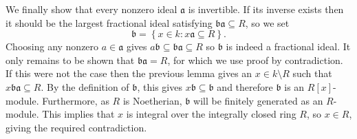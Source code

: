 \documentclass[12pt]{article}
\begin{document}
We finally show that every nonzero ideal $\mathfrak{a}$ is invertible. If its inverse exists then it should be the largest fractional ideal satisfying $\mathfrak{ba}\subseteq R$, so we set
\begin{equation*}
\mathfrak{b}=\left\{x\in k:x\mathfrak{a}\subseteq R\right\}.
\end{equation*}
Choosing any nonzero $a\in\mathfrak{a}$ gives $a\mathfrak{b}\subseteq\mathfrak{ba}\subseteq R$ so $\mathfrak{b}$ is indeed a fractional ideal. It only remains to be shown that $\mathfrak{ba}=R$, for which we use proof by contradiction. If this were not the case then the previous lemma gives an $x\in k\setminus R$ such that $x\mathfrak{ba}\subseteq R$.
By the definition of $\mathfrak{b}$, this gives $x\mathfrak{b}\subseteq\mathfrak{b}$ and therefore $\mathfrak{b}$ is an $R[x]$-module. Furthermore, as $R$ is Noetherian, $\mathfrak{b}$ will be finitely generated as an $R$-module. This implies that $x$ is integral over the integrally closed ring $R$, so $x\in R$, giving the required contradiction.

\end{document}
